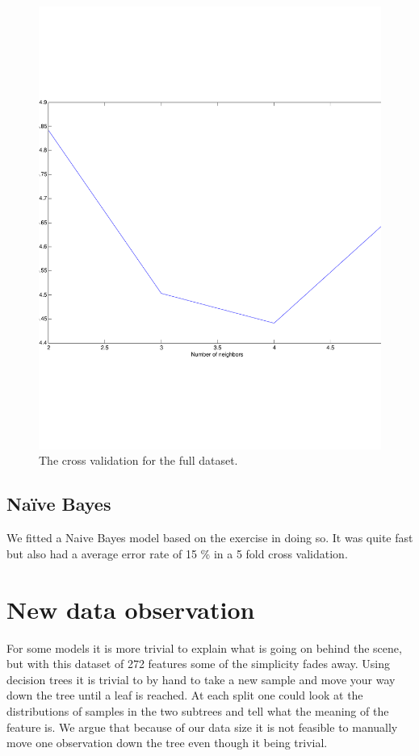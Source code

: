 \begin{figure}[H]
\centering
\includegraphics[width=0.6\linewidth, trim= 0mm 30mm 0mm 30mm, clip]{code/5fold_knn_60000samples}
\caption{The cross validation for the full dataset.\label{fig:knn_large}}
\end{figure}



\subsection{Naïve Bayes}
We fitted a Naive Bayes model based on the exercise in doing so. It was quite fast but also had a average error rate of 15 \% in a 5 fold cross validation.


\section{New data observation}
For some models it is more trivial to explain what is going on behind the scene, but with this dataset of 272 features some of the simplicity fades away. Using decision trees it is trivial to by hand to take a new sample and move your way down the tree until a leaf is reached. At each split one could look at the distributions of samples in the two subtrees and tell what the meaning of the feature is. We argue that because of our data size it is not feasible to manually move one observation down the tree even though it being trivial. 

